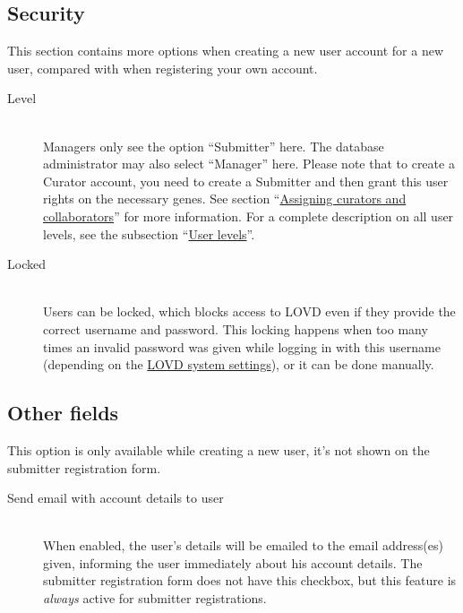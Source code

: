 \documentclass[a4paper,oneside,openany,12pt]{memoir}
\begin{document}
\pagebreak[4] %
\subsection{Security}
This section contains more options when creating a new user account for a new user, compared with when registering your own account.
\begin{description}
  \item[Level] \hfill \\
  Managers only see the option ``Submitter'' here.
  The database administrator may also select ``Manager'' here.
  Please note that to create a Curator account, you need to create a Submitter and then grant this user rights on the necessary genes.
  See section ``\hyperlink{s_gene_assign_curators}{Assigning curators and collaborators}'' for more information.
  For a complete description on all user levels, see the subsection ``\hyperlink{ss_user_levels}{User levels}''.
  \item[Locked] \hfill \\
  Users can be locked, which blocks access to LOVD even if they provide the correct username and password.
  This locking happens when too many times an invalid password was given while logging in with this username
   (depending on the \hyperlink{s_system_settings}{LOVD system settings}), or it can be done manually.
\end{description}



\subsection{Other fields}
This option is only available while creating a new user, it's not shown on the submitter registration form.
\begin{description}
  \item[Send email with account details to user] \hfill \\
  When enabled, the user's details will be emailed to the email address(es) given, informing the user immediately about his account details.
  The submitter registration form does not have this checkbox, but this feature is \emph{always} active for submitter registrations.
\end{description}
\end{document}
